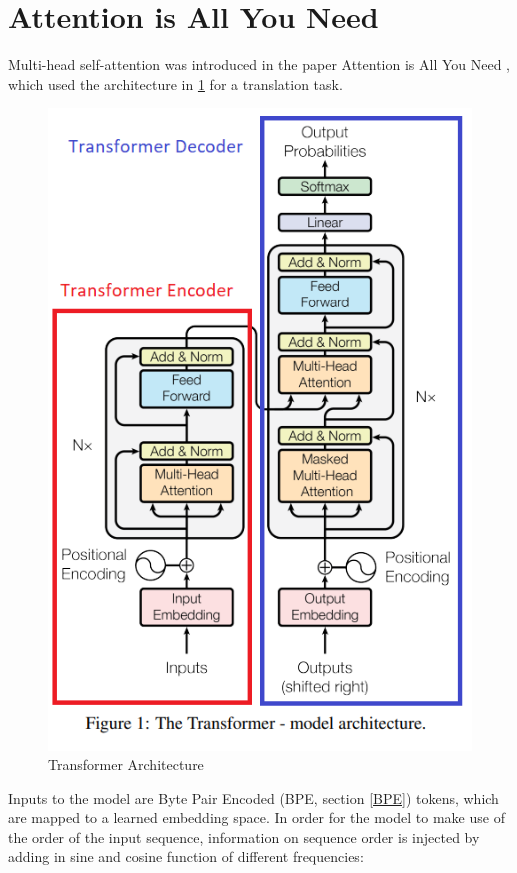 \documentclass[11pt]{article}
\theoremstyle{definition}
\begin{document}
\section{Attention is All You Need \cite{vaswani2017attention}}

Multi-head self-attention was introduced in the paper Attention is All You Need \cite{vaswani2017attention}, which used the architecture in \ref{fig:fulltransformer} for a translation task.

\begin{figure}
\centering
  \includegraphics{transformers/transformer_architecture.png}
  \caption{Transformer Architecture \cite{vaswani2017attention}}
  \label{fig:fulltransformer}
\end{figure}

Inputs to the model are Byte Pair Encoded (BPE, section \ref{BPE}) tokens, which are mapped to a learned embedding space. In order for the model to make use of the order of the input sequence, information on sequence order is injected by adding in sine and cosine function of different frequencies:
\end{document}

